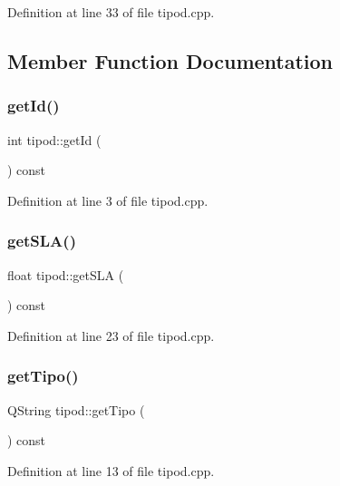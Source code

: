 Definition at line 33 of file tipod.\+cpp.



\subsection{Member Function Documentation}
\hypertarget{classtipod_a8f9426cbcef23976293ae0961b382907}{}\label{classtipod_a8f9426cbcef23976293ae0961b382907} 
\subsubsection{\texorpdfstring{get\+Id()}{getId()}}
{\footnotesize\ttfamily int tipod\+::get\+Id (\begin{DoxyParamCaption}{ }\end{DoxyParamCaption}) const}



Definition at line 3 of file tipod.\+cpp.

\hypertarget{classtipod_a19cb0132a802684607abe02c0c2b63f2}{}\label{classtipod_a19cb0132a802684607abe02c0c2b63f2} 
\subsubsection{\texorpdfstring{get\+S\+L\+A()}{getSLA()}}
{\footnotesize\ttfamily float tipod\+::get\+S\+LA (\begin{DoxyParamCaption}{ }\end{DoxyParamCaption}) const}



Definition at line 23 of file tipod.\+cpp.

\hypertarget{classtipod_ab84c5257439bcf916770d2facad689de}{}\label{classtipod_ab84c5257439bcf916770d2facad689de} 
\subsubsection{\texorpdfstring{get\+Tipo()}{getTipo()}}
{\footnotesize\ttfamily Q\+String tipod\+::get\+Tipo (\begin{DoxyParamCaption}{ }\end{DoxyParamCaption}) const}



Definition at line 13 of file tipod.\+cpp.

